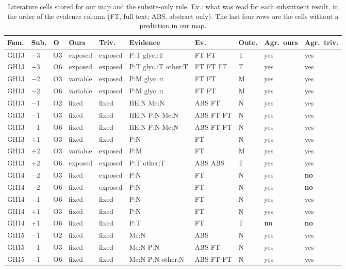 \documentclass[preprint,12pt]{elsarticle}
\begin{document}
\begin{table}[h]
\centering\scriptsize\setlength{\tabcolsep}{2pt}
\caption{Literature cells scored for our map and the subsite-only rule. Ev.: what was read for each substituent
result, in the order of the evidence column (FT, full text; ABS, abstract only). The last four rows are the cells
without a prediction in our map.}
\label{tab:cells}
\begin{tabular}{lllllp{2.9cm}p{1.2cm}lll}
\toprule
Fam. & Sub. & O & Ours & Triv. & Evidence & Ev. & Outc. & Agr.\ ours & Agr.\ triv.\\
\midrule
GH13 & $-$3 & O3 & exposed & exposed & P:T glyc.:T & FT FT & T & yes & yes\\
GH13 & $-$3 & O6 & exposed & exposed & P:T glyc.:T other:T & FT FT FT & T & yes & yes\\
GH13 & $-$2 & O3 & variable & exposed & P:M glyc.:n & FT FT & M & yes & yes\\
GH13 & $-$2 & O6 & variable & exposed & P:M glyc.:n & FT FT & M & yes & yes\\
GH13 & $-$1 & O2 & fixed & fixed & HE:N Me:N & ABS FT & N & yes & yes\\
GH13 & $-$1 & O3 & fixed & fixed & HE:N P:N Me:N & ABS FT FT & N & yes & yes\\
GH13 & $-$1 & O6 & fixed & fixed & HE:N P:N Me:N & ABS FT FT & N & yes & yes\\
GH13 & $+$1 & O3 & fixed & fixed & P:N & FT & N & yes & yes\\
GH13 & $+$2 & O3 & variable & exposed & P:M & FT & M & yes & yes\\
GH13 & $+$2 & O6 & exposed & exposed & P:T other:T & ABS ABS & T & yes & yes\\
GH14 & $-$2 & O3 & fixed & exposed & P:N & FT & N & yes & \textbf{no}\\
GH14 & $-$2 & O6 & fixed & exposed & P:N & FT & N & yes & \textbf{no}\\
GH14 & $-$1 & O6 & fixed & fixed & P:N & FT & N & yes & yes\\
GH14 & $+$1 & O3 & fixed & fixed & P:N & FT & N & yes & yes\\
GH14 & $+$1 & O6 & fixed & fixed & P:T & FT & T & \textbf{no} & \textbf{no}\\
GH15 & $-$1 & O2 & fixed & fixed & Me:N & ABS & N & yes & yes\\
GH15 & $-$1 & O3 & fixed & fixed & Me:N P:N & ABS FT & N & yes & yes\\
GH15 & $-$1 & O6 & fixed & fixed & Me:N P:N other:N & ABS FT FT & N & yes & yes\\

\end{tabular}
\end{table}
\end{document}
